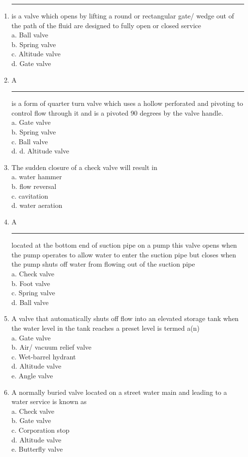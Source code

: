 \documentclass{article}
\begin{document}
\begin{enumerate}[1.]
\item \rule{9mm}{.1pt} is a valve which opens by lifting a round or rectangular gate/ wedge out of the path of the fluid are designed to fully open or closed service\\

a.	Ball valve\\
b.	Spring valve\\
c.	Altitude valve\\
d.	Gate valve\\

\item A \rule{9mm}{.1pt} is a form of quarter turn valve which uses a hollow perforated and pivoting to control flow through it and is a pivoted 90 degrees by the valve handle.\\
a.	Gate valve\\
b.	Spring valve\\
c.	Ball valve\\
d.	d.  Altitude valve

\item The sudden closure of a check valve will result in\\
a.	water hammer\\
b.	flow reversal\\
c.	cavitation\\
d.	water aeration\\

\item A \rule{9mm}{.1pt} located at the bottom end of suction pipe on a pump this valve opens when the pump operates to allow water to enter the suction pipe but closes when the pump shuts off water from flowing out of the suction pipe\\
a.	Check valve\\
b.	Foot valve\\
c. 	Spring valve\\
d.	Ball valve

\item A valve that automatically shuts off flow into an elevated storage tank when the water level in the tank reaches a preset level is termed a(n)\\
a.	Gate valve\\
b.	Air/ vacuum relief valve\\
c.	Wet-barrel hydrant\\
d.	Altitude valve\\
e.	Angle valve

\item A normally buried valve located on a street water main and leading to a water service is known as\\
a.	Check valve\\
b.	Gate valve \\
c.	Corporation stop\\
d.	Altitude valve\\
e.	Butterfly valve


\end{enumerate}
\end{document}
